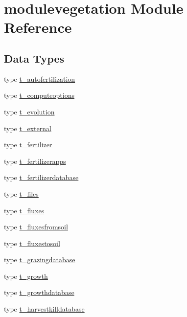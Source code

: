 \hypertarget{namespacemodulevegetation}{}\section{modulevegetation Module Reference}
\label{namespacemodulevegetation}
\subsection*{Data Types}
\begin{DoxyCompactItemize}
\item 
type \mbox{\hyperlink{structmodulevegetation_1_1t__autofertilization}{t\+\_\+autofertilization}}
\item 
type \mbox{\hyperlink{structmodulevegetation_1_1t__computeoptions}{t\+\_\+computeoptions}}
\item 
type \mbox{\hyperlink{structmodulevegetation_1_1t__evolution}{t\+\_\+evolution}}
\item 
type \mbox{\hyperlink{structmodulevegetation_1_1t__external}{t\+\_\+external}}
\item 
type \mbox{\hyperlink{structmodulevegetation_1_1t__fertilizer}{t\+\_\+fertilizer}}
\item 
type \mbox{\hyperlink{structmodulevegetation_1_1t__fertilizerapps}{t\+\_\+fertilizerapps}}
\item 
type \mbox{\hyperlink{structmodulevegetation_1_1t__fertilizerdatabase}{t\+\_\+fertilizerdatabase}}
\item 
type \mbox{\hyperlink{structmodulevegetation_1_1t__files}{t\+\_\+files}}
\item 
type \mbox{\hyperlink{structmodulevegetation_1_1t__fluxes}{t\+\_\+fluxes}}
\item 
type \mbox{\hyperlink{structmodulevegetation_1_1t__fluxesfromsoil}{t\+\_\+fluxesfromsoil}}
\item 
type \mbox{\hyperlink{structmodulevegetation_1_1t__fluxestosoil}{t\+\_\+fluxestosoil}}
\item 
type \mbox{\hyperlink{structmodulevegetation_1_1t__grazingdatabase}{t\+\_\+grazingdatabase}}
\item 
type \mbox{\hyperlink{structmodulevegetation_1_1t__growth}{t\+\_\+growth}}
\item 
type \mbox{\hyperlink{structmodulevegetation_1_1t__growthdatabase}{t\+\_\+growthdatabase}}
\item 
type \mbox{\hyperlink{structmodulevegetation_1_1t__harvestkilldatabase}{t\+\_\+harvestkilldatabase}}
\item 

\end{DoxyCompactItemize}
